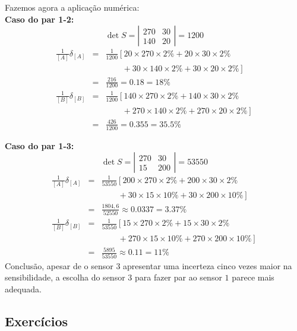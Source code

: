 \begin{resol}
Fazemos agora a aplicação numérica:\\
{\bf Caso do par 1-2:}
\begin{equation} \det{S}=\left|\begin{matrix}270&30\\140&20\end{matrix}\right|=1200 \end{equation}
\begin{eqnarray}
\frac{1}{[A]}\delta_{[A]}
&=&\frac{1}{1200}\left[20\times 270\times 2\%+20\times 30\times 2\%\right.\\
&\ & \qquad +\left.30\times 140\times 2\%+30\times 20\times 2\%\right]\\&=&\frac{216}{1200}=0.18=18\%\\
\frac{1}{[B]}\delta_{[B]}
&=&\frac{1}{1200}\left[140\times 270\times 2\%+140\times 30\times 2\%\right.\\
&\ & \qquad +\left.270\times 140\times 2\%+270\times 20\times 2\%\right]\\&=&\frac{426}{1200}=0.355=35.5\%
\end{eqnarray}

{\bf Caso do par 1-3:}
\begin{equation} \det{S}=\left|\begin{array}{cc}270&30\\15&200\end{array}\right|=53550 \end{equation}
\begin{eqnarray}
\frac{1}{[A]}\delta_{[A]}
&=&\frac{1}{53550}\left[200\times 270\times 2\%+200\times 30\times 2\%\right.\\
&\ & \qquad +\left.30\times 15\times 10\%+30\times 200\times 10\%\right]\\&=&\frac{1804,6}{52550}\approx 0.0337=3.37\%\\
\frac{1}{[B]}\delta_{[B]}
&=&\frac{1}{53550}\left[15\times 270\times 2\%+15\times 30\times 2\%\right.\\
&\ & \qquad +\left.270\times 15\times 10\%+270\times 200\times 10\%\right]\\&=&	\frac{5895}{53550}\approx   0.11=11\%
\end{eqnarray}
Conclusão, apesar de o sensor $3$ apresentar uma incerteza cinco vezes maior na sensibilidade, a escolha do sensor $3$ para fazer par ao sensor $1$ parece mais adequada.
\end{resol}


\subsection*{Exercícios}

